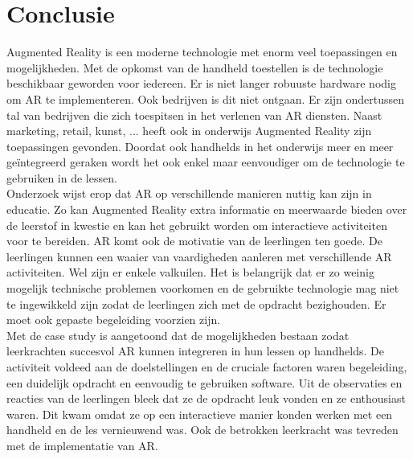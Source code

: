 \documentclass[pdftex,a4paper,12pt,twoside]{report}
\begin{document}

\chapter{Conclusie}
\label{ch:conclusie}
Augmented Reality is een moderne technologie met enorm veel toepassingen en mogelijkheden. Met de opkomst van de handheld toestellen is de technologie beschikbaar geworden voor iedereen. Er is niet langer robuuste hardware nodig om AR te implementeren. Ook bedrijven is dit niet ontgaan. Er zijn ondertussen tal van bedrijven die zich toespitsen in het verlenen van AR diensten. Naast marketing, retail, kunst, ...  heeft ook in onderwijs Augmented Reality zijn toepassingen gevonden. Doordat ook handhelds in het onderwijs meer en meer ge\"integreerd geraken wordt het ook enkel maar eenvoudiger om de technologie te gebruiken in de lessen. \\

Onderzoek wijst erop dat AR op verschillende manieren nuttig kan zijn in educatie. Zo kan Augmented Reality extra informatie en meerwaarde bieden over de leerstof in kwestie en kan het gebruikt worden om interactieve activiteiten voor te bereiden. AR komt ook de motivatie van de leerlingen ten goede. De leerlingen kunnen een waaier van vaardigheden aanleren met verschillende AR activiteiten.  Wel zijn er enkele valkuilen. Het is belangrijk dat er zo weinig mogelijk technische problemen voorkomen en de gebruikte technologie mag niet te ingewikkeld zijn zodat de leerlingen zich met de opdracht bezighouden. Er moet ook gepaste begeleiding voorzien zijn. \\

Met de case study is aangetoond dat de mogelijkheden bestaan zodat leerkrachten succesvol AR kunnen integreren in hun lessen op handhelds. De activiteit voldeed aan de doelstellingen en de cruciale factoren waren begeleiding, een duidelijk opdracht en eenvoudig te gebruiken software. Uit de observaties en reacties van de leerlingen bleek dat ze de opdracht leuk vonden en ze enthousiast waren. Dit kwam omdat ze op een interactieve manier konden werken met een handheld en de les vernieuwend was. Ook de betrokken leerkracht was tevreden met de implementatie van AR. \\
\end{document}
